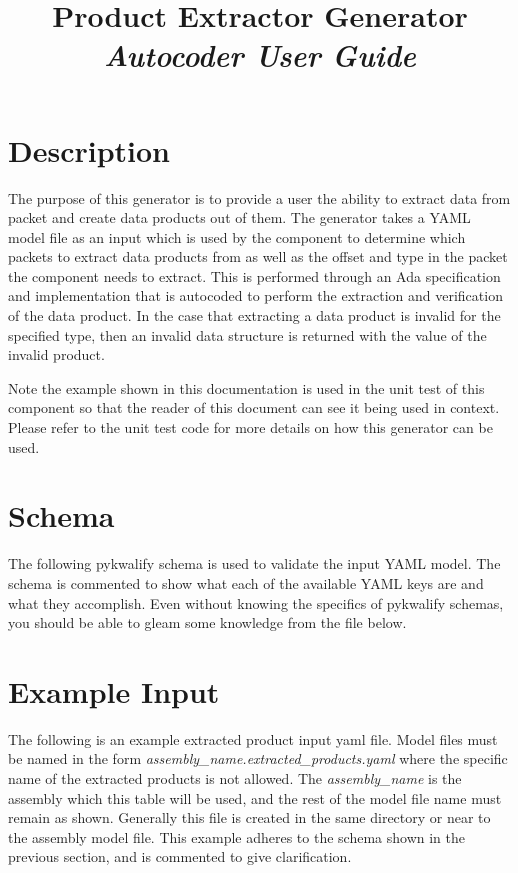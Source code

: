 



\title{\textbf{Product Extractor Generator} \\
\large\textit{Autocoder User Guide}}
\date{}
\maketitle

\section{Description}

The purpose of this generator is to provide a user the ability to extract data from packet and create data products out of them. The generator takes a YAML model file as an input which is used by the component to determine which packets to extract data products from as well as the offset and type in the packet the component needs to extract. This is performed through an Ada specification and implementation that is autocoded to perform the extraction and verification of the data product. In the case that extracting a data product is invalid for the specified type, then an invalid data structure is returned with the value of the invalid product. 

Note the example shown in this documentation is used in the unit test of this component so that the reader of this document can see it being used in context. Please refer to the unit test code for more details on how this generator can be used.

\section{Schema}

The following pykwalify schema is used to validate the input YAML model. The schema is commented to show what each of the available YAML keys are and what they accomplish. Even without knowing the specifics of pykwalify schemas, you should be able to gleam some knowledge from the file below.


\section{Example Input}

The following is an example extracted product input yaml file. Model files must be named in the form \textit{assembly\_name.extracted\_products.yaml} where the specific name of the extracted products is not allowed. The \textit{assembly\_name} is the assembly which this table will be used, and the rest of the model file name must remain as shown. Generally this file is created in the same directory or near to the assembly model file. This example adheres to the schema shown in the previous section, and is commented to give clarification.


